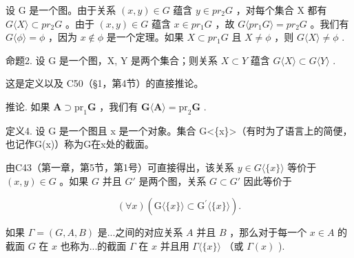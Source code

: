 设 G 是一个图。由于关系 \((x, y) \in G\) 蕴含 \(y \in pr_{2}G\) ，对每个集合 X 都有 \(G\langle X \rangle \subset pr_{2}G\) 。由于 \((x, y) \in G\) 蕴含 \(x \in pr_{1}G\) ，故 \(G\langle pr_{1}G \rangle = pr_{2}G\) 。我们有 \(G\langle \phi \rangle = \phi\) ，因为 \(x \notin \phi\) 是一个定理。如果 \(X \subset pr_{1}G\) 且 \(X \neq \phi\) ，则 \(G\langle X \rangle \neq \phi\) .

命题2. 设 G 是一个图，X, Y 是两个集合；则关系 \(X \subset Y\) 蕴含 \(G\langle X\rangle \subset G\langle Y\rangle\) .

这是定义以及 C50（§1，第4节）的直接推论。

推论. 如果 \(\mathbf{A} \supset \mathrm{pr}_1\mathbf{G}\) ，我们有 \(\mathbf{G}\langle \mathbf{A} \rangle = \mathrm{pr}_2\mathbf{G}\) .

定义4. 设 G 是一个图且 x 是一个对象。集合 G\textless\{x\}\textgreater（有时为了语言上的简便，也记作G(x)）称为G在x处的截面。

由C43（第一章，第5节，第1号）可直接得出，该关系 \(y \in G \langle \{x\} \rangle\) 等价于 \((x, y) \in G\) 。如果 \(G\) 并且 \(G'\) 是两个图，关系 \(G \subset G'\) 因此等价于

\[
(\forall x) (\mathrm{G} \langle \{x \} \rangle \subset \mathrm{G} ^ {\prime} \langle \{x \} \rangle).
\]

如果 \(\Gamma = (G, A, B)\) 是...之间的对应关系 \(A\) 并且 \(B\) ，那么对于每一个 \(x \in A\) 的截面 \(G\) 在 \(x\) 也称为...的截面 \(\Gamma\) 在 \(x\) 并且用 \(\Gamma \langle \{x\} \rangle\) （或 \(\Gamma(x)\) ).

